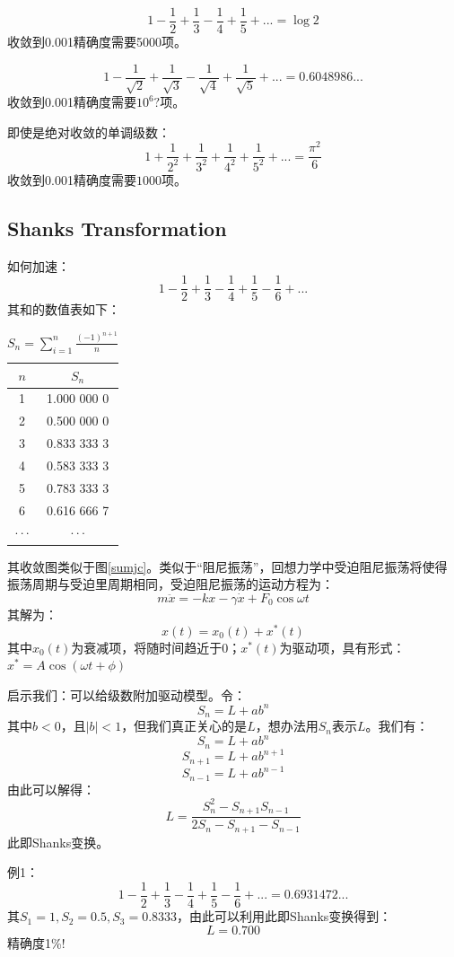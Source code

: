 \[1-\frac{1}{2}+\frac{1}{3}-\frac{1}{4}+\frac{1}{5}+... = \log 2\]
收敛到0.001精确度需要5000项。

\[1-\frac{1}{\sqrt{2}}+\frac{1}{\sqrt{3}}-\frac{1}{\sqrt{4}}+\frac{1}{\sqrt{5}}+... = 0.6048986...\]
收敛到0.001精确度需要$10^6?$项。

即使是绝对收敛的单调级数：
\[1+\frac{1}{2^2}+\frac{1}{3^2}+\frac{1}{4^2}+\frac{1}{5^2}+... = \frac{\pi^2}{6}\]
收敛到0.001精确度需要$1000$项。

\subsection{Shanks Transformation}
\label{st}

如何加速：
\[1-\frac{1}{2}+\frac{1}{3}-\frac{1}{4}+\frac{1}{5}-\frac{1}{6}+...\]
其和的数值表如下：\\
\begin{table}
	\centering
	\begin{tabular}{c|c}
		$n$  &  $S_n$\\
		\hline
		1    & 1.000 000 0\\
		2    & 0.500 000 0\\
		3    & 0.833 333 3\\
		4    & 0.583 333 3\\
		5    & 0.783 333 3\\
		6    & 0.616 666 7\\
		$\cdot\cdot\cdot$  & $\cdot\cdot\cdot$ 
	\end{tabular}
	\caption{$S_n=\sum_{i=1}^{n}\frac{(-1)^{n+1}}{n}$}
\end{table}
其收敛图类似于图\ref{sumjc}。类似于“阻尼振荡”，回想力学中受迫阻尼振荡将使得振荡周期与受迫里周期相同，受迫阻尼振荡的运动方程为：
\[m \ddot{x} = -kx -\gamma \dot{x} +F_0 \cos\omega t\]
其解为：
\[x(t) = x_0(t) +x^*(t) \]
其中$ x_0(t)$为衰减项，将随时间趋近于0；$x^*(t)$为驱动项，具有形式：$x^* = A\cos(\omega t + \phi)$

启示我们：可以给级数附加驱动模型。令：
\[S_n = L +a b^n\]
其中$b<0$，且$|b|<1$，但我们真正关心的是$L$，想办法用$S_n$表示$L$。我们有：
\[S_n = L +a b^n\]
\[S_{n+1} = L +a b^{n+1}\]
\[S_{n-1} = L +a b^{n-1}\]
由此可以解得：
\[L = \frac{S_n^2-S_{n+1}S_{n-1}}{2S_n-S_{n+1}-S_{n-1}}\]
此即Shanks变换。

例1：
\[1-\frac{1}{2}+\frac{1}{3}-\frac{1}{4}+\frac{1}{5}-\frac{1}{6}+... = 0.6931472...\]
其$S_1=1,S_2=0.5,S_3=0.8333$，由此可以利用此即Shanks变换得到：
\[L = 0.700\]
精确度1\%!

